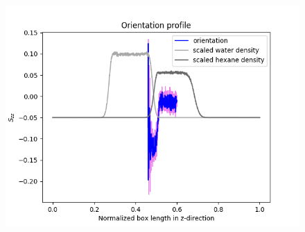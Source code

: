 \documentclass[12pt,reqno]{amsart}
\numberwithin{equation}{section}
\begin{document}
\begin{enumerate}
\begin{figure}[H]
\centering
\includegraphics[scale=0.6]{full-255-1bead-orientations-hexane}
\end{figure}



\end{enumerate}
\end{document}
